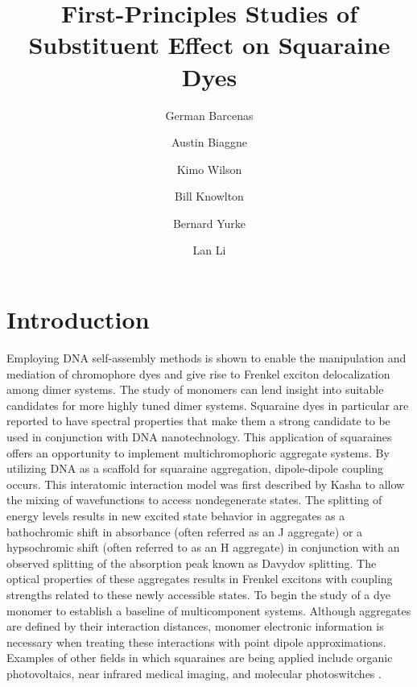 \documentclass[journal=jacsat,manuscript=article]{achemso}
\title{
First-Principles Studies of Substituent Effect on Squaraine Dyes\\
}
\author{German Barcenas}
\affiliation{Boise State University}
\author{Austin Biaggne}
\affiliation{Boise State University}
\author{Kimo Wilson}
\affiliation{Boise State University}
\author{Bill Knowlton}
\affiliation{Boise State University}
\author{Bernard Yurke}
\affiliation{Boise State University}
\author{Lan Li}
\affiliation{Boise State University}
\begin{document}
\maketitle

\section{Introduction}
Employing DNA self-assembly methods is shown to enable the manipulation and mediation of chromophore dyes and give rise to Frenkel exciton delocalization among dimer systems\cite{Cannon2018LargeAggregates}. The study of monomers can lend insight into suitable candidates for more highly tuned dimer systems. Squaraine dyes in particular are reported to have spectral properties that make them a strong candidate to be used in conjunction with DNA nanotechnology\cite{Markova2013ComparisonLabels}⁠. This application of squaraines offers an opportunity to implement multichromophoric aggregate systems. 
By utilizing DNA as a scaffold for squaraine aggregation, dipole-dipole coupling occurs\cite{Cannon2017CoherentSystem}. This interatomic interaction model was first described by Kasha to allow the mixing of wavefunctions to access nondegenerate states\cite{Kasha1965TheSpectroscopy}. The splitting of energy levels results in new excited state behavior in aggregates as a bathochromic shift in absorbance (often referred as an J aggregate) or a hypsochromic shift (often referred to as an H aggregate)\cite{Wurthner2011J-aggregates:Materials} in conjunction with an observed splitting of the absorption peak known as Davydov splitting\cite{Zhong2019DavydovDimers}. The optical properties of these aggregates results in Frenkel excitons with coupling strengths related to these newly accessible states. 
To begin the study of a dye monomer to establish a baseline of multicomponent systems. Although aggregates are defined by their interaction distances, monomer electronic information is necessary when treating these interactions with point dipole approximations\cite{Abramavicius2009ExtractingSpectra}. Examples of other fields in which squaraines are being applied include organic photovoltaics\citep{Wei2012FunctionalizedPhotovoltaics, Chen2018DensityCell}, near infrared medical imaging\cite{Strassel2018SquaraineNm}⁠, and molecular photoswitches\citep{Kellis2019AnPhases, Scholes2011LessonsHarvesting} .
\end{document}
